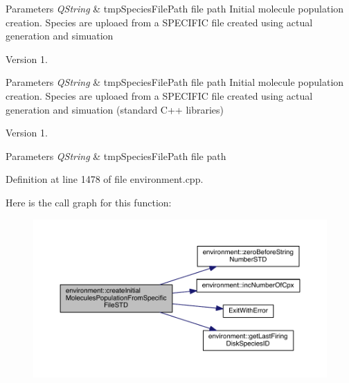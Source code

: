 \begin{DoxyParams}{Parameters}
{\em Q\-String} & tmp\-Species\-File\-Path file path Initial molecule population creation. Species are uploaed from a S\-P\-E\-C\-I\-F\-I\-C file created using actual generation and simuation \\
\hline
\end{DoxyParams}
\begin{DoxyVersion}{Version}
1. 
\end{DoxyVersion}

\begin{DoxyParams}{Parameters}
{\em Q\-String} & tmp\-Species\-File\-Path file path Initial molecule population creation. Species are uploaed from a S\-P\-E\-C\-I\-F\-I\-C file created using actual generation and simuation (standard C++ libraries) \\
\hline
\end{DoxyParams}
\begin{DoxyVersion}{Version}
1. 
\end{DoxyVersion}

\begin{DoxyParams}{Parameters}
{\em Q\-String} & tmp\-Species\-File\-Path file path \\
\hline
\end{DoxyParams}


Definition at line 1478 of file environment.\-cpp.



Here is the call graph for this function\-:
\nopagebreak
\begin{figure}[H]
\begin{center}
\leavevmode
\includegraphics[width=350pt]{a00014_aa70e1394bf2240f6e5f14d4cbf369a3b_cgraph}
\end{center}
\end{figure}


